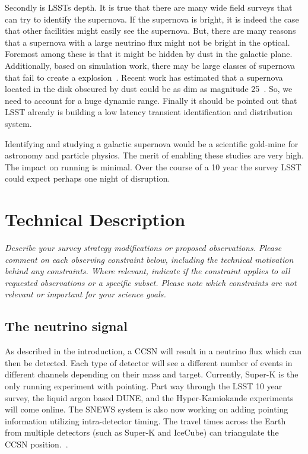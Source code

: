 \documentclass[11pt]{article}
\newcommand{\superk}  {Super\nobreakdash-K\xspace}
\begin{document}
Secondly is LSSTs depth. It is true that there are many wide field
surveys that can try to identify the supernova.  If the supernova is
bright, it is indeed the case that other facilities might easily see
the supernova.  But, there are many reasons that a supernova with a
large neutrino flux might not be bright in the optical.  Foremost
among these is that it might be hidden by dust in the galactic plane.
Additionally, based on simulation work, there may be large classes of
supernova that fail to create a explosion~\cite{Evanpaper}. Recent
work has estimated that a supernova located in the disk obscured by
dust could be as dim as magnitude 25~\cite{2016MNRAS.461.3296N}.
So, we need to account for a huge dynamic range.  Finally it should be
pointed out that LSST already is building a low latency transient
identification and distribution system.

Identifying and studying a galactic supernova would be a scientific
gold-mine for astronomy and particle physics.  The merit of enabling
these studies are very high. The impact on running is minimal.  Over
the course of a 10 year the survey LSST could expect perhaps one night of
disruption.

\section{Technical Description}
\begin{footnotesize}
{\it Describe your survey strategy modifications or proposed observations. Please comment on each observing constraint
below, including the technical motivation behind any constraints. Where relevant, indicate
if the constraint applies to all requested observations or a specific subset. Please note which 
constraints are not relevant or important for your science goals.}
\end{footnotesize}

\subsection{The neutrino signal}
\label{sec:signal}

As described in the introduction, a CCSN will result in a neutrino
flux which can then be detected.  Each type of detector will see a
different number of events in different channels depending on their
mass and target.  Currently, \superk is the only running experiment
with pointing.  Part way through the LSST 10 year survey, the liquid
argon based DUNE, and the Hyper-Kamiokande experiments will come
online.  The SNEWS system is also now working on adding pointing
information utilizing intra-detector timing.  The travel times across
the Earth from multiple detectors (such as \superk and IceCube) can
triangulate the CCSN position.~\cite{Katepaper}.
\end{document}
